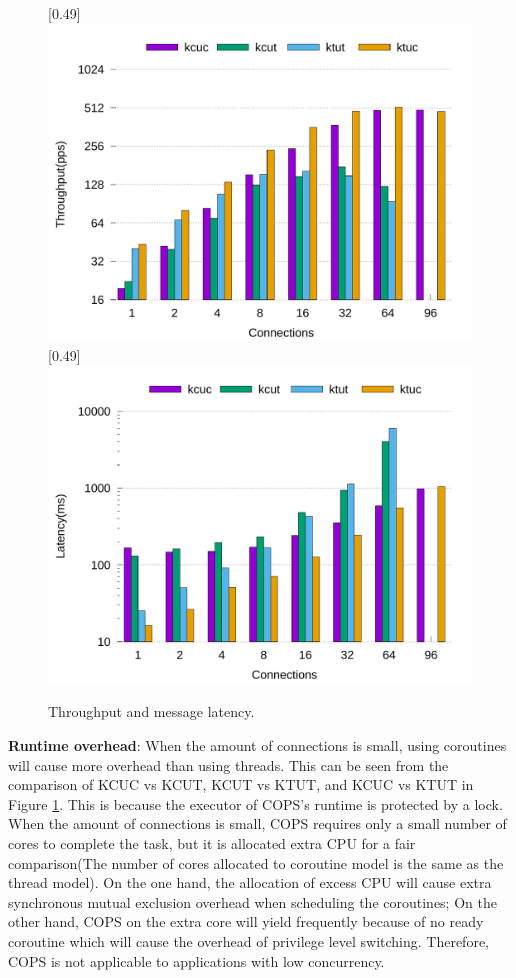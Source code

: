 \documentclass[sigconf,review,anonymous]{acmart}
\begin{document}
\begin{figure}[ht]
	\centering
	[0.49\linewidth]
	{
		\includegraphics[width=\linewidth]{assets/throughput.pdf}
	}
	[0.49\linewidth]
	{
		\includegraphics[width=\linewidth]{assets/latency.pdf}
	}
	\caption{Throughput and message latency.}
	\label{fig:throughput-latency}
\end{figure}

\textbf{Runtime overhead}: When the amount of connections is small, using coroutines will cause more overhead than using threads. This can be seen from the comparison of KCUC vs KCUT, KCUT vs KTUT, and KCUC vs KTUT in Figure \ref{fig:throughput-latency}. This is because the executor of COPS's runtime is protected by a lock. When the amount of connections is small, COPS requires only a small number of cores to complete the task, but it is allocated extra CPU for a fair comparison(The number of cores allocated to coroutine model is the same as the thread model). On the one hand, the allocation of excess CPU will cause extra synchronous mutual exclusion overhead when scheduling the coroutines; On the other hand, COPS on the extra core will yield frequently because of no ready coroutine which will cause the overhead of privilege level switching. Therefore, COPS is not applicable to applications with low concurrency.
\end{document}
